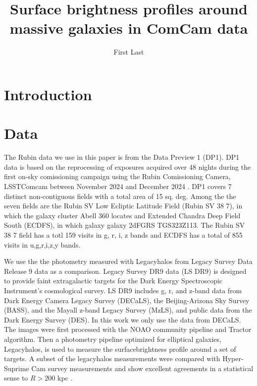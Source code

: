 \documentclass[SE,lsstdraft,authoryear,toc]{lsstdoc}
\title{Surface brightness profiles around massive galaxies in ComCam data}
\author{%
First Last
}
\date{\vcsDate}
\begin{document}
\maketitle


\section{Introduction}

\section{Data}
The Rubin data we use in this paper is from the Data Preview 1 (DP1). DP1 data is based on the reprocessing of exposures acquired over 48 nights during the first on-sky comissioning campaign using the Rubin Comissioning Camera, LSSTComcam between November 2024 and December 2024 \cite{ComCam}. DP1 covers 7 distinct non-contiguous fields with a total area of 15 sq. deg. Among the the seven fields are the Rubin SV Low Ecliptic Latitude Field (Rubin SV 38 7), in which the galaxy cluster Abell 360 locates and Extended Chandra Deep Field South (ECDFS), in which galaxy galaxy 2dFGRS TGS323Z113. The Rubin SV 38 7 field has a totl 159 visits in g, r, i, z bands and ECDFS has a total of 855 visits in u,g,r,i,z,y bands. 

We use the the photometry measured with Legacyhalos \cite{liReachingEdgeProbing2022,moustakasSienaGalaxyAtlas2023} from Legacy Survey Data Release 9 data as a comparison. Legacy Survey DR9 data (LS DR9) \cite{schlegelDESILegacyImaging2021} is designed to provide faint extragalactic targets for the Dark Energy Spectroscopic Instrument's cosmological survey. LS DR9 includes g, r, and z-band data from Dark Energy Camera Legacy Survey (DECaLS), the Beijing-Arizona Sky Survey (BASS), and the Mayall z-band Legacy Survey (MzLS), and public data from the Dark Energy Survey (DES). In this work we only use the data from DECaLS. The images were first processed with the NOAO community pipeline and Tractor algorithm. Then a photometry pipeline optimized for elliptical galaxies, Legacyhalos, is used to measure the surfacebrightness profile around a set of targets. A subset of the legacyhalos measurements were compared with Hyper-Suprime Cam survey measurements and show excellent agreements in a statistical sense to $R > 200$ kpc \cite{liReachingEdgeProbing2022}. 
\end{document}
